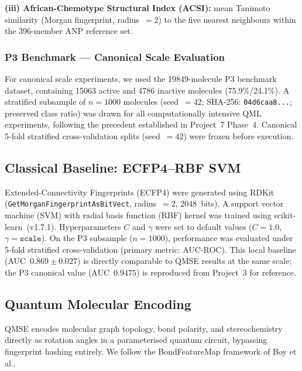 \textbf{(iii) African-Chemotype Structural Index (ACSI):} mean Tanimoto
similarity (Morgan fingerprint, radius~$= 2$) to the five nearest neighbours
within the 396-member ANP reference set.

\subsubsection{P3 Benchmark — Canonical Scale Evaluation}

For canonical scale experiments, we used the \num{19849}-molecule P3 benchmark
dataset\cite{sao2026p3}, containing \num{15063} active and \num{4786} inactive
molecules (75.9\%/24.1\%). A stratified subsample of $n = 1000$ molecules
(seed~$= 42$; SHA-256: \texttt{04d6caa8...}; preserved class ratio) was drawn
for all computationally intensive QML experiments, following the precedent
established in Project~7 Phase~4. Canonical 5-fold stratified cross-validation
splits (seed~$= 42$) were frozen before execution.


\subsection{Classical Baseline: ECFP4--RBF SVM}

Extended-Connectivity Fingerprints (ECFP4)\cite{rogers2010} were generated
using RDKit (\texttt{GetMorganFingerprintAsBitVect}, radius~$= 2$, 2048~bits).
A support vector machine (SVM) with radial basis function (RBF) kernel was
trained using scikit-learn~(v1.7.1)\cite{sklearn}. Hyperparameters $C$ and
$\gamma$ were set to default values ($C = 1.0$, $\gamma = \texttt{scale}$).
On the P3 subsample ($n = 1000$), performance was evaluated under
5-fold stratified cross-validation (primary metric: AUC-ROC). This local
baseline (AUC~$0.869 \pm 0.027$) is directly comparable to QMSE results
at the same scale; the P3 canonical value (AUC~$0.9475$) is reproduced
from Project~3\cite{sao2026p3} for reference.


\subsection{Quantum Molecular Encoding}
\label{sec:qmse}

QMSE encodes molecular graph topology, bond polarity, and stereochemistry
directly as rotation angles in a parameterised quantum circuit, bypassing
fingerprint hashing entirely. We follow the BondFeatureMap framework of
Boy et al.\cite{boy2025}.


